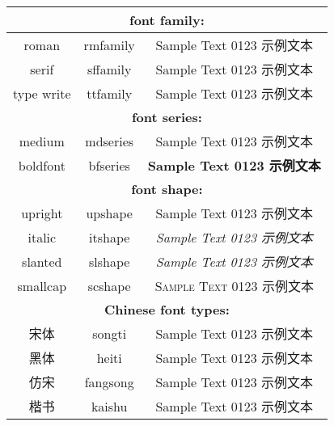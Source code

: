 \pagestyle{plain}
\fancyhf{}
\thispagestyle{empty}
\begin{center}
\begin{tabular}{|c|c|c|}
\hline
\multicolumn{3}{|c|}{\textbf{font family:}}\\\hline
roman		&	{\ttfamily {\textbackslash}rmfamily}	&	{\rmfamily	Sample Text 0123 示例文本}\\
serif		&	{\ttfamily {\textbackslash}sffamily}	&	{\sffamily	Sample Text 0123 示例文本}\\
type	write	&	{\ttfamily {\textbackslash}ttfamily}	&	{\ttfamily	Sample Text 0123 示例文本}\\
\hline
\multicolumn{3}{|c|}{\textbf{font series:}}\\\hline
medium		&	{\ttfamily {\textbackslash}mdseries}	&	{\mdseries	Sample Text 0123 示例文本}\\
boldfont		&	{\ttfamily {\textbackslash}bfseries}	&	{\bfseries	Sample Text 0123 示例文本}\\
\hline
\multicolumn{3}{|c|}{\textbf{font shape:}}\\\hline
upright		&	{\ttfamily {\textbackslash}upshape}	&	{\upshape	Sample Text 0123 示例文本}\\
italic		&	{\ttfamily {\textbackslash}itshape}	&	{\itshape	Sample Text 0123 示例文本}\\
slanted		&	{\ttfamily {\textbackslash}slshape}	&	{\slshape	Sample Text 0123 示例文本}\\
smallcap		&	{\ttfamily {\textbackslash}scshape}	&	{\scshape	Sample Text 0123 示例文本}\\
\hline
\multicolumn{3}{|c|}{\textbf{Chinese font types:}}\\\hline
宋体		&	{\ttfamily {\textbackslash}songti}	&	{\songti		Sample Text 0123 示例文本}\\
黑体		&	{\ttfamily {\textbackslash}heiti}	&	{\heiti	Sample Text 0123 示例文本}\\
仿宋		&	{\ttfamily {\textbackslash}fangsong}	&	{\fangsong		Sample Text 0123 示例文本}\\
楷书		&	{\ttfamily {\textbackslash}kaishu}	&	{\kaishu		Sample Text 0123 示例文本}\\
\hline
\end{tabular}
\end{center}
\pagebreak

\restoregeometry
